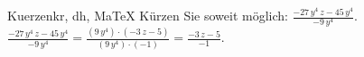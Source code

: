 \begin{MAufgabe}{Kuerzen}{kr, dh, MaTeX}
K\"urzen Sie soweit m\"oglich: $\frac{ - 27\, y^4\, z - 45\, y^4}{- 9\, y^4}$.\\ 
\ifLsg\MLoesung
\quad $\frac{ - 27\, y^4\, z - 45\, y^4}{- 9\, y^4}=\frac{(9\, y^4)\cdot( - 3\, z - 5)}{(9\, y^4)\cdot(-1)}=\frac{ - 3\, z - 5}{-1}$.\else\relax\fi
 \end{MAufgabe}